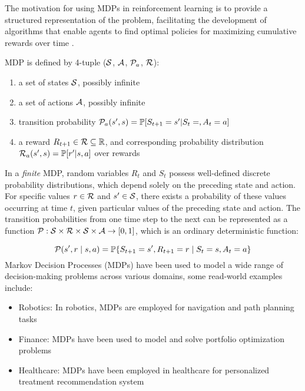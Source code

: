 The motivation for using MDPs in reinforcement learning is to provide a structured representation of the problem, facilitating the development of algorithms that enable agents to find optimal policies for maximizing cumulative rewards over time \cite{RL2}.
\begin{definition}
    MDP is defined by 4-tuple ($\mathcal{S}$, $\mathcal A$, $\mathcal P_a$, $\mathcal R$):
    \begin{enumerate}
        \item a set of states $\mathcal{S}$, possibly infinite
        \item a set of actions $\mathcal A$, possibly infinite
        \item  transition probability $\mathcal P_a(s',s) = \mathbb P [S_{t+1} = s'| S_{t} = ,A_{t} = a]$
        \item a reward $R_{t+1} \in \mathcal R \subseteq \mathbb R$, and corresponding probability distribution $ \mathcal R_a(s',s) = \mathbb P[r' | s,a]$ over rewards
    \end{enumerate}
\end{definition}

In a \textit{finite} MDP, random variables $R_t$ and $S_t$ possess well-defined discrete probability distributions, which depend solely on the preceding state and action. For specific values $r \in \mathcal R$ and $s' \in \mathcal{S}$, there exists a probability of these values occurring at time $t$, given particular values of the preceding state and action. The transition probabilities from one time step to the next can be represented as a function $\mathcal P: \mathcal{S} \times \mathcal R \times 
\mathcal{S} \times \mathcal A \to [0,1]$, which is an ordinary deterministic function\cite{RL}:

\begin{equation}
    \mathcal P(s', r \mid s, a) = \mathbb{P}\{S_{t+1} = s', R_{t+1} = r \mid S_t = s, A_t = a\}
\end{equation}
Markov Decision Processes (MDPs) have been used to model a wide range of decision-making problems across various domains, some read-world examples include:
\begin{itemize}
    \item Robotics: In robotics, MDPs are employed for navigation and path planning tasks \cite{thrun2005}
    \item Finance: MDPs have been used to model and solve portfolio optimization problems \cite{buehler2019}
    \item Healthcare: MDPs have been employed in healthcare for personalized treatment recommendation system 
    \cite{komorowski2018}
\end{itemize}

